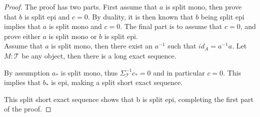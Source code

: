     \begin{proof}
        The proof has two parts. First assume that $a$ is split mono, then prove that $b$ is split epi and $c = 0$. By duality, it is then known that $b$ being split epi implies that $a$ is split mono and $c = 0$. The final part is to assume that $c = 0$, and prove either $a$ is split mono or $b$ is split epi. \\

        Assume that $a$ is split mono, then there exist an $a^{-1}$ such that $id_A = a^{-1}a$. Let $M:\mathcal{T}$ be any object, then there is a long exact sequence.
        \begin{center}
        \end{center}
        By assumption $a_*$ is split mono, thus $\Sigma_{\mathcal{T}}^{-1}c_* = 0$ and in particular $c = 0$. This implies that $b_*$ is epi, making a split short exact sequence.
        \begin{center}
        \end{center}
        This split short exact sequence shows that b is split epi, completing the first part of the proof.


\end{proof}
